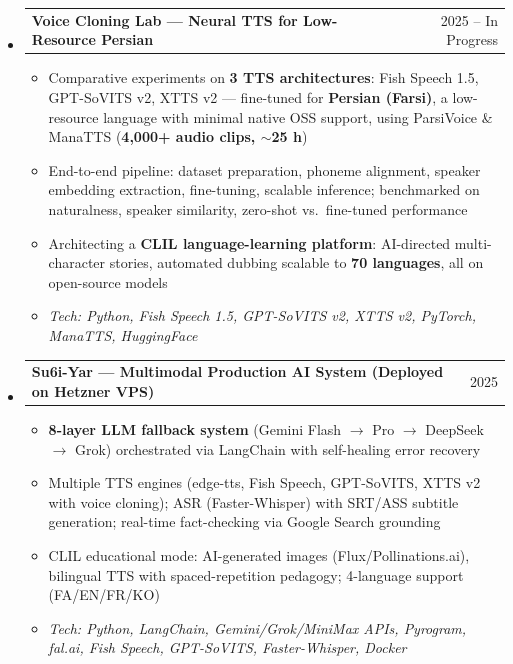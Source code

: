 \documentclass[11pt,a4paper]{article}
\makeatletter
\newcommand{\subspace}{\vspace{0.5em}}
\newcommand{\headerrow}[2]{
    \begin{tabular*}{\linewidth}{l@{\extracolsep{\fill}}r}
    #1 & \textcolor{primary}{#2} \\
    \end{tabular*}
}
\makeatother
\begin{document}
\begin{itemize}[leftmargin=1em, label={}]

    \item
    \headerrow{\textbf{Voice Cloning Lab — Neural TTS for Low-Resource Persian}}{2025 -- In Progress}
    \begin{itemize}[leftmargin=1.5em, label=$\bullet$, nosep]
        \item Comparative experiments on \textbf{3 TTS architectures}: Fish Speech 1.5, GPT-SoVITS v2, XTTS v2 — fine-tuned for \textbf{Persian (Farsi)}, a low-resource language with minimal native OSS support, using ParsiVoice \& ManaTTS (\textbf{4,000+ audio clips, $\sim$25 h})
        \item End-to-end pipeline: dataset preparation, phoneme alignment, speaker embedding extraction, fine-tuning, scalable inference; benchmarked on naturalness, speaker similarity, zero-shot vs.\ fine-tuned performance
        \item Architecting a \textbf{CLIL language-learning platform}: AI-directed multi-character stories, automated dubbing scalable to \textbf{70 languages}, all on open-source models
        \item \emph{Tech: Python, Fish Speech 1.5, GPT-SoVITS v2, XTTS v2, PyTorch, ManaTTS, HuggingFace}
    \end{itemize}

    \subspace
    \item
    \headerrow{\textbf{Su6i-Yar — Multimodal Production AI System (Deployed on Hetzner VPS)}}{2025}
    \begin{itemize}[leftmargin=1.5em, label=$\bullet$, nosep]
        \item \textbf{8-layer LLM fallback system} (Gemini Flash $\to$ Pro $\to$ DeepSeek $\to$ Grok) orchestrated via LangChain with self-healing error recovery
        \item Multiple TTS engines (edge-tts, Fish Speech, GPT-SoVITS, XTTS v2 with voice cloning); ASR (Faster-Whisper) with SRT/ASS subtitle generation; real-time fact-checking via Google Search grounding
        \item CLIL educational mode: AI-generated images (Flux/Pollinations.ai), bilingual TTS with spaced-repetition pedagogy; 4-language support (FA/EN/FR/KO)
        \item \emph{Tech: Python, LangChain, Gemini/Grok/MiniMax APIs, Pyrogram, fal.ai, Fish Speech, GPT-SoVITS, Faster-Whisper, Docker}
    \end{itemize}

\end{itemize}
\end{document}
